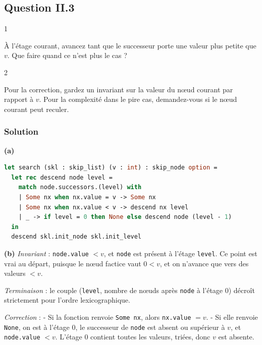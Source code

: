 \documentclass[11pt,a4paper]{article}
\begin{document}
\hypertarget{question-ii.3}{%
\subsection{Question II.3}\label{question-ii.3}}

\begin{indication}{1}

À l'étage courant, avancez tant que le successeur porte une valeur plus petite que \(v\). Que faire quand ce n'est plus le cas ?

\end{indication}

\begin{indication}{2}

Pour la correction, gardez un invariant sur la valeur du nœud courant par rapport à \(v\). Pour la complexité dans le pire cas, demandez-vous si le nœud courant peut reculer.

\end{indication}

\hypertarget{solution-12}{%
\subsubsection{Solution}\label{solution-12}}

\textbf{(a)}

\begin{lstlisting}[language=Caml]
let search (skl : skip_list) (v : int) : skip_node option =
  let rec descend node level =
    match node.successors.(level) with
    | Some nx when nx.value = v -> Some nx
    | Some nx when nx.value < v -> descend nx level
    | _ -> if level = 0 then None else descend node (level - 1)
  in
  descend skl.init_node skl.init_level
\end{lstlisting}

\textbf{(b)} \emph{Invariant} : \texttt{node.value} \(<v\), et \texttt{node} est présent à l'étage \texttt{level}. Ce point est vrai au départ, puisque le nœud factice vaut \(0<v\), et on n'avance que vers des valeurs \(<v\).

\emph{Terminaison} : le couple (\texttt{level}, nombre de nœuds après \texttt{node} à l'étage 0) décroît strictement pour l'ordre lexicographique.

\emph{Correction} :
- Si la fonction renvoie \texttt{Some\ nx}, alors \texttt{nx.value} \(=v\).
- Si elle renvoie \texttt{None}, on est à l'étage 0, le successeur de \texttt{node} est absent ou supérieur à \(v\), et \texttt{node.value} \(<v\). L'étage 0 contient toutes les valeurs, triées, donc \(v\) est absente.
\end{document}
